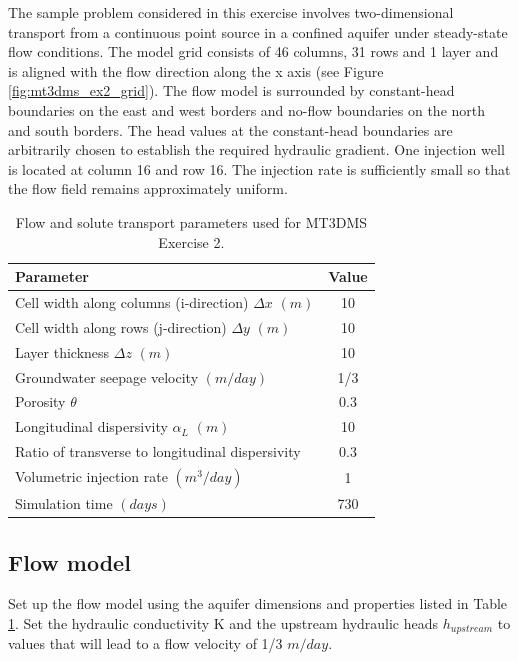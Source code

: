 The sample problem considered in this exercise involves 
two-dimensional transport from a
continuous point source in a confined aquifer 
under steady-state flow conditions. The model
grid consists of 46 columns, 31 rows and 1 layer 
and is aligned with the flow direction along the
x axis (see Figure \ref{fig:mt3dms_ex2_grid}). 
The flow model is surrounded 
by constant-head boundaries on the east and
west borders and no-flow boundaries on the north 
and south borders. The head values at the
constant-head boundaries are arbitrarily chosen to 
establish the required hydraulic gradient. 
One injection well is located at column 16 and row 16. 
The injection rate is sufficiently small so that
the flow field remains approximately uniform. 

\begin{table}[hb]
\caption{Flow and solute transport parameters used for MT3DMS Exercise 2.}
\begin{center}
\begin{tabular}{lc} 
\toprule
Parameter                                            &         Value \\
\midrule
Cell width along columns (i-direction) $\Delta x $ $(m)$        &    10 \\
Cell width along rows (j-direction) $\Delta y $ $(m)$           &    10 \\
Layer thickness $\Delta z $ $(m)$                 &    10 \\
Groundwater seepage velocity $(m/day)$              &   1/3 \\
Porosity $\theta$                                         &     0.3 \\
Longitudinal dispersivity $\alpha_L$ $(m)$        &   10 \\
Ratio of transverse to longitudinal dispersivity  &  0.3 \\
Volumetric injection rate $(m^3/day)$               &   1  \\
Simulation time $(days)$                            & 730  \\
\bottomrule
\end{tabular}
\label{aerobic_flow}
\end{center}
\end{table}

\subsection{Flow model}

Set up the flow model using the aquifer dimensions and properties 
listed in Table \ref{aerobic_flow}. Set the hydraulic conductivity K and the
upstream hydraulic heads $h_{upstream}$ to values that will lead to a flow velocity of 1/3 $m/day$.

